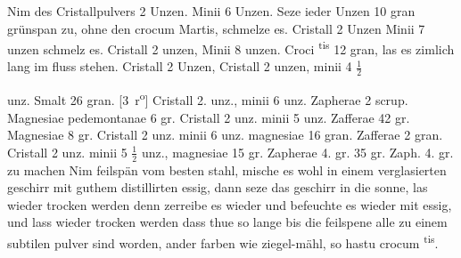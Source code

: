 \pend%
\pstart%
Nim des Cristallpulvers 2 Unzen. Minii 6 Unzen. Seze ieder Unzen 10 gran gr\"{u}nspan zu, ohne den crocum Martis, schmelze es.
\pend%
\pstart%
\protect{}
Cristall 2 Unzen Minii 7 unzen schmelz es.
\pend%
\pstart%
Cristall 2 unzen, Minii 8 unzen. Croci \mars\textsuperscript{tis} 12 gran, las es zimlich lang im fluss stehen.
\pend%
\pstart%
Cristall 2 Unzen, 
\pend%
\pstart%
Cristall 2 unzen, minii 4 $\displaystyle\frac{1}{2}$\rule[-4mm]{0mm}{10mm} unz. Smalt 26 gran.
[3~r\textsuperscript{o}]
\pend%
\pstart%
Cristall 2. unz., minii 6 unz. Zapherae 2 scrup. Magnesiae pedemontanae 6 gr.
\pend%
\pstart%
Cristall 2 unz. minii 5 unz. Zafferae 42 gr. Magnesiae 8 gr.
\pend%
\pstart%
Cristall 2 unz. minii 6 unz. magnesiae 16 gran. Zafferae 2 gran.
\pend%
\pstart%
Cristall 2 unz. minii 5 $\displaystyle\frac{1}{2}$%
 unz., magnesiae 15 gr. Zapherae 4. gr.
\pend%
\newpage%
\pstart%
 35 gr. Zaph. 4. gr.
\pend%
\pstart%
\protect{} zu machen
Nim feilsp\"{a}n vom besten stahl, mische es wohl in einem verglasierten geschirr mit guthem distillirten essig,\protect{}
dann seze das geschirr in die sonne, las wieder trocken werden denn zerreibe es wieder und befeuchte es wieder mit essig,\protect{}
und lass wieder trocken werden dass thue so lange bis die feilspene alle zu einem subtilen pulver sind worden,
ander farben wie ziegel-m\"{a}hl, so hastu crocum \mars\textsuperscript{tis}.\protect{}
\pend%
\count{}
\count{}
\count{}